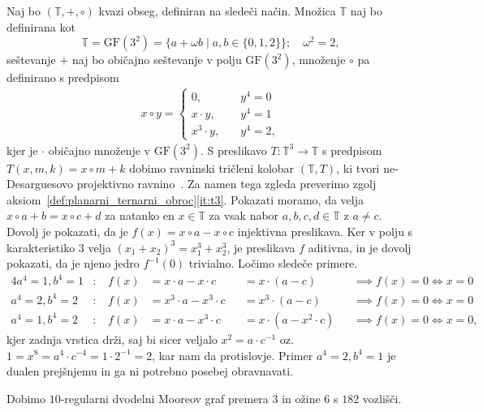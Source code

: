 \documentclass[fin1, tisk]{fmfdelo}
\newcommand{\R}{\mathbb{T}}
\newcommand{\GF}{\mathrm{GF}}
\begin{document}
\begin{zgled}
    Naj bo $(\R, +, \circ)$ kvazi obseg, definiran na sledeči način.
    Množica $\R$ naj bo definirana kot
    $$\R=\GF(3^2)=\{a + \omega b \mid a, b \in \{0,1,2\}\};\quad \omega^2 = 2,$$
    seštevanje $+$ naj bo običajno seštevanje v polju $\GF(3^2)$, 
    množenje $\circ$ pa definirano s predpisom
    \begin{align*}
        x \circ y = 
        \begin{cases}
            0, & \quad y^4 = 0 \\
            x\cdot y, & \quad y^4 = 1 \\
            x^3\cdot y, & \quad y^4 = 2,
        \end{cases}
    \end{align*}
    kjer je $\cdot$ običajno množenje v $\GF(3^2)$. 
    S preslikavo $T: \R^3 \to \R$ s predpisom $T(x, m, k) = x\circ m + k$ dobimo 
    ravninski tričleni kolobar $(\R, T)$, ki tvori ne-\-De\-sargues\-ovo projektivno ravnino~\cite{ivanov2016affine}.
    Za namen tega zgleda preverimo zgolj aksiom~\ref{def:planarni_ternarni_obroc}\ref{it:t3}.
    Pokazati moramo, da velja $x\circ a + b = x\circ c + d$ za natanko en $x\in\R$ za vsak nabor $a,b,c,d\in\R$ z $a\neq c$.
    Dovolj je pokazati, da je $f(x) = x\circ a - x\circ c$ injektivna preslikava. Ker v polju s karakteristiko $3$ velja
    $(x_1 + x_2)^3 = x_1^3 + x_2^3$, je preslikava $f$ aditivna, in je dovolj pokazati, da je njeno jedro $f^{-1}(0)$ trivialno.
    Ločimo sledeče primere.
    \begin{alignat*}{4}
        a^4 = 1, b^4 = 1&:\;& f(x) &= x\cdot a - x\cdot c &&= x\cdot (a - c) &&\implies f(x) = 0 \iff x = 0\\
        a^4 = 2, b^4 = 2&:\;& f(x) &= x^3\cdot a - x^3\cdot c &&= x^3\cdot (a - c) &&\implies f(x) = 0 \iff x = 0 \\
        a^4 = 1, b^4 = 2&:\;& f(x) &= x\cdot a - x^3\cdot c &&= x\cdot (a-x^2\cdot c) &&\implies f(x) = 0\iff x = 0,
    \end{alignat*}
    kjer zadnja vrstica drži, saj bi sicer veljalo $x^2 = a\cdot c^{-1}$ oz.~$1 = x^8 = a^4\cdot c^{-4} = 1\cdot 2^{-1} = 2$, kar nam da protislovje.
    Primer $a^4 = 2, b^4 = 1$ je dualen prejšnjemu in ga ni potrebno posebej obravnavati.

    Dobimo $10$-regularni dvodelni Mooreov graf premera $3$ in ožine $6$ s $182$ vozlišči.
\end{zgled}
\end{document}
